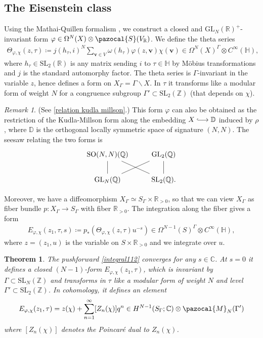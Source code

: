 \documentclass[a4paper,11pt]{amsart} %
\newcommand{\8}{\infty}
\newcommand{\Z}{\mathbb{Z}}
\newcommand{\vbf}{\mathbf{v}}
\newcommand{\SO}{\mathrm{SO}}
\newcommand{\SL}{\mathrm{SL}}
\newcommand{\GL}{\mathrm{GL}}
\newcommand{\D}{\mathbb{D}}
\newcommand{\HH}{\mathbb{H}}
\newcommand{\R}{\mathbb{R}}
\newcommand{\Q}{\mathbb{Q}}
\newcommand{\C}{\mathbb{C}}
\newcommand{\Scal}{\pazocal{S}}
\newcommand{\hooklongrightarrow}{\lhook\joinrel\longrightarrow}
\newcommand{\Mcal}{\pazocal{M}}
\theoremstyle{mytheoremstyle}
\newtheorem{thm}{Theorem}[section]
\theoremstyle{remark}
\newtheorem{rmk}{Remark}[section]
\numberwithin{equation}{section}
\begin{document}
\subsection{The Eisenstein class} Using the Mathai-Quillen formalism \cite{mq}, we construct a closed and $\GL_N(\R)^+$-invariant form $\varphi \in \Omega^N(X) \otimes \Scal(V_\R)$. We define the theta series
\begin{align}
\Theta_{\varphi, \chi}(z,\tau) \coloneqq j(h_\tau,i)^N  \sum_{\vbf \in V} \omega(h_\tau) \varphi(z,\vbf)\chi(\vbf) \in \Omega^N(X)^{\Gamma} \otimes C^\8(\HH),
\end{align}
where $h_\tau \in \SL_2(\R)$ is any matrix sending $i$ to $\tau \in \HH$ by Möbius transformations and $j$ is the standard automorphy factor. The theta series is $\Gamma$-invariant in the variable $z$, hence defines a form on $X_{\Gamma}=\Gamma \backslash X$. In $\tau$ it transforms like a modular form of weight $N$ for a congruence subgroup $\Gamma' \subset \SL_2(\Z)$ (that depends on $\chi$). 

\begin{rmk}(See \ref{relation kudla millson}.) This form $\varphi$ can also be obtained as the restriction of the Kudla-Millson form along the embedding $X \hooklongrightarrow \D$ induced by $\rho$, where $\D$ is the orthogonal locally symmetric space of signature $(N,N)$. The seesaw relating the two forms is
\[
\begin{tikzcd}
\SO(N,N)(\Q) \arrow[dash, dr] & \GL_2(\Q) \\
\GL_N(\Q) \arrow[dash]{u} \arrow[dash, ru] &\SL_2(\Q). \arrow[dash]{u}
\end{tikzcd}
\]

\end{rmk}

 Moreover, we have a diffeomorphism $X_\Gamma \simeq S_\Gamma \times \R_{>0}$, so that we can view $X_\Gamma$ as fiber bundle $p \colon X_\Gamma \longrightarrow S_\Gamma$ with fiber $\R_{>0}$. The integration along the fiber gives a form
\begin{align} \label{integral112}
E_{\varphi, \chi}(z_1,\tau,s) \coloneqq p_\ast \left ( \Theta_{\varphi, \chi}(z,\tau)u^{-s} \right )\in \Omega^{N-1}(S)^{\Gamma} \otimes C^\8(\HH),
\end{align}
where $z=(z_1,u)$ is the variable on $S \times \R_{>0}$ and we integrate over $u$. 


\begin{thm} \label{theoremA} The pushforward \eqref{integral112} converges for any $s \in \C$. At $s=0$ it defines a closed $(N-1)$-form $E_{\varphi, \chi}(z_1,\tau)$, which is invariant by $\Gamma \subset \SL_N(\Z)$ and transforms in $\tau$ like a modular form of weight $N$ and level $\Gamma' \subset \SL_2(\Z)$. In cohomology, it defines an element
\begin{align}
E_{\varphi, \chi}(z_1,\tau) = z(\chi)+\sum_{n=1}^\8 [Z_n(\chi)] q^n \in H^{N-1}(S_\Gamma;\C)\otimes \Mcal_N(\Gamma')
\end{align}
where $[Z_n(\chi)]$ denotes the Poincaré dual to $Z_n(\chi)$.
\end{thm}
\end{document}
